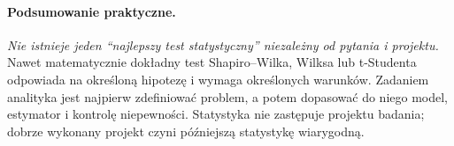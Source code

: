 \documentclass[11pt,a4paper,oneside]{report}
\numberwithin{equation}{chapter}
\theoremstyle{plain}
\theoremstyle{definition}
\theoremstyle{remark}
\begin{document}
\paragraph{Podsumowanie praktyczne.}
\emph{Nie istnieje jeden ``najlepszy test statystyczny'' niezależny od pytania i projektu.} Nawet matematycznie dokładny test Shapiro--Wilka, Wilksa lub t-Studenta odpowiada na określoną hipotezę i wymaga określonych warunków. Zadaniem analityka jest najpierw zdefiniować problem, a potem dopasować do niego model, estymator i kontrolę niepewności. Statystyka nie zastępuje projektu badania; dobrze wykonany projekt czyni późniejszą statystykę wiarygodną.
\end{document}

